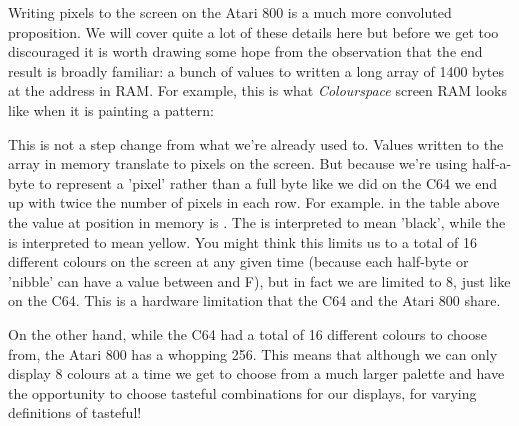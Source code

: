

Writing pixels to the screen on the Atari 800 is a much more convoluted proposition. We will cover
quite a lot of these details here but before we get too discouraged it is worth drawing some hope
from the observation that the end result is broadly familiar: a bunch of values to written a long
array of 1400 bytes at the address  in RAM. For example, this is what \textit{Colourspace}
screen RAM looks like when it is painting a pattern:



This is not a step change from what we're already used to. Values written to the array in memory translate
to pixels on the screen. But because we're using half-a-byte to represent a 'pixel' rather than a full byte
like we did on the C64 we end up with twice the number of pixels in each row. For example. in the table above
the value at position  in memory is . The  is interpreted to mean 'black',
while the  is interpreted to mean yellow. You might think this limits us to a total of 16 different colours on the screen at
any given time (because each half-byte or 'nibble' can have a value between  and {F}), but in fact we
are limited to 8, just like on the C64. This is a hardware limitation that the C64 and the Atari 800 share.

On the other hand, while the C64 had a total of 16 different colours to choose from, the Atari 800 has a whopping
256. This means that although we can only display 8 colours at a time we get to choose from a much larger palette and
have the opportunity to choose tasteful combinations for our displays, for varying definitions of tasteful!




